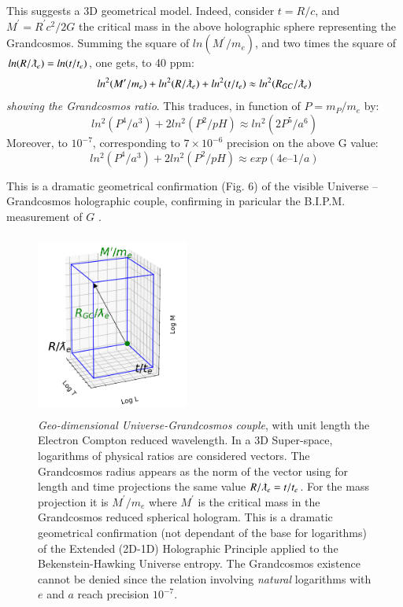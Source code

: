 \documentclass[twoside,draft]{article}
\begin{document}
\begin{sloppypar}
This suggests a 3D geometrical model. Indeed, consider $t =R/c$, and $M^{\prime} = R^{\prime} c^{2} /2G$ the critical mass in the above holographic sphere representing the Grandcosmos. Summing the square of $ln(M^{\prime}/m_{e} )$, and two times the square of $ln(R/\lambdabar_{e} ) = ln(t/t_{e} )$, one gets, to 40 ppm:
\begin{equation}
ln^{2} (M^{\prime}/m_{e} ) + ln^{2} (R/\lambdabar_{e}) + ln^2 (t/t_{e} ) \approx ln^2 (R_{GC} /\lambdabar_{e} )
\end{equation} 
\textit{showing the Grandcosmos ratio}. This traduces, in function of $P = m_P/m_e$ by:
\begin{equation}
ln^2(P^4/a^3) + 2 ln^2(P^2/pH) \approx ln^2(2P^5/a^6)
\end{equation}
Moreover, to $10^{-7}$, corresponding to $7 \times 10^{-6}$ precision on the above G value:
\begin{equation}
ln^2(P^4/a^3) + 2 ln^2(P^2/pH) \approx exp(4e – 1/a)
\end{equation}
 
This is a dramatic geometrical confirmation (Fig. 6) of the visible Universe – Grandcosmos holographic couple, confirming in paricular the B.I.P.M. measurement of $G$ \cite{Quinn}.


\begin{figure}[h]
\centering
\includegraphics[width=5cm,height=6cm]{./figures/triaxis.png}
\caption {\textit{Geo-dimensional Universe-Grandcosmos couple}, with unit length the Electron Compton reduced wavelength. 
In a 3D Super-space, logarithms of physical ratios are considered vectors. The Grandcosmos radius appears as the norm of the vector using for length and time projections the same value $R/\lambdabar_e = t/t_e$. For the mass projection it is $M^{\prime}/m_e$ where
$M^{\prime}$ is the critical mass in the Grandcosmos reduced spherical hologram. This is a dramatic geometrical confirmation (not dependant of the base for logarithms) of the Extended (2D-1D) Holographic Principle applied to the Bekenstein-Hawking Universe entropy. The Grandcosmos existence cannot be denied since the relation involving \textit{natural} logarithms with $e$ and $a$ reach precision $10^{-7}$.} 
\end{figure}


\end{sloppypar}
\end{document}

